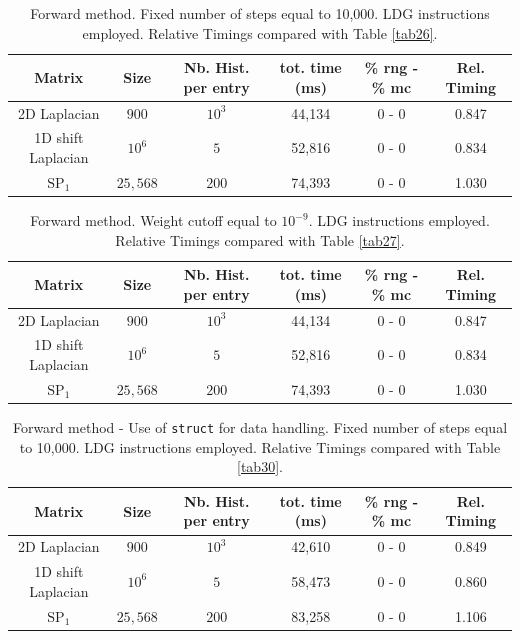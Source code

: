 \documentclass[a4paper,10pt]{article}
\begin{document}
\begin{table}[!h]
\hspace*{-1cm}
\begin{tabular}{|c|c|c|c|c|c|}
\hline
\textbf{Matrix} & \textbf{Size} &\textbf{Nb. Hist. per entry} & tot. time 
(ms) & \% rng - 
\% mc  & Rel. Timing\\
\hline
2D Laplacian& $900$ & $10^3$ & 44,134 & 0 - 0 & 0.847\\
\hline 
1D shift Laplacian& $10^6$ & $5$ & 52,816 & 0 - 0 & 0.834\\
\hline
$\text{SP}_1$ & $25,568$ & $200$ & 74,393 & 0 - 0 & 1.030\\
\hline
\end{tabular}
\caption{Forward method. Fixed number of steps equal to 10,000. LDG 
instructions employed. Relative Timings compared with Table 
\ref{tab26}.}
\label{tab40}
\end{table}



\begin{table}[!h]
\hspace*{-1cm}
\begin{tabular}{|c|c|c|c|c|c|}
\hline
\textbf{Matrix} & \textbf{Size} &\textbf{Nb. Hist. per entry} & tot. time 
(ms) & \% rng - 
\% mc  & Rel. Timing\\
\hline
2D Laplacian& $900$ & $10^3$ & 44,134 & 0 - 0 & 0.847\\
\hline 
1D shift Laplacian& $10^6$ & $5$ & 52,816 & 0 - 0 & 0.834\\
\hline
$\text{SP}_1$ & $25,568$ & $200$ & 74,393 & 0 - 0 & 1.030\\
\hline
\end{tabular}
\caption{Forward method. Weight cutoff equal to $10^{-9}$. LDG instructions 
employed. Relative Timings compared with Table 
\ref{tab27}.}
\label{tab41}
\end{table}

\begin{table}[!h]
\hspace*{-1cm}
\begin{tabular}{|c|c|c|c|c|c|}
\hline
\textbf{Matrix} & \textbf{Size} &\textbf{Nb. Hist. per entry} & tot. time 
(ms) & \% rng - 
\% mc  & Rel. Timing\\
\hline
2D Laplacian& $900$ & $10^3$ & 42,610 & 0 - 0 & 0.849\\
\hline 
1D shift Laplacian& $10^6$ & $5$ & 58,473 & 0 - 0 & 0.860\\
\hline
$\text{SP}_1$ & $25,568$ & $200$ & 83,258 & 0 - 0 & 1.106\\
\hline
\end{tabular}
\caption{Forward method - Use of \texttt{struct} for data handling. Fixed 
number of steps equal 
to 10,000. LDG instructions employed. Relative Timings compared with Table 
\ref{tab30}.}
\label{tab42}
\end{table}
\end{document}
